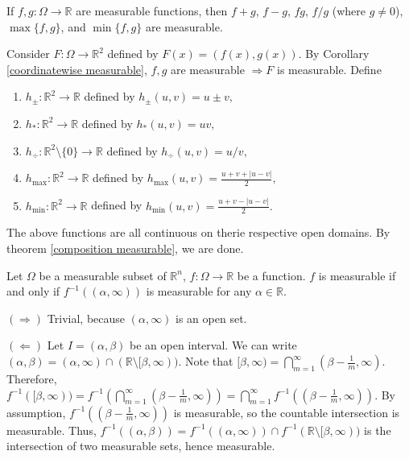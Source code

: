 \begin{corollary}
    If $f, g: \Omega \rightarrow \mathbb{R}$ are measurable functions, then $f+g$, $f-g$, $fg$, $f/g$ (where $g \neq 0$), $\max\{f,g\}$, and $\min\{f,g\}$ are measurable.
\end{corollary}

\begin{pfbox}
    Consider $F: \Omega \rightarrow \mathbb{R}^2$ defined by $F(x) = (f(x), g(x))$. By Corollary \eqref{coordinatewise measurable}, $f, g$ are measurable $\Rightarrow F$ is measurable. 
    Define 
    \begin{enumerate}
        \item $h_{\pm}: \mathbb{R}^2\to\mathbb{R}$ defined by $h_{\pm}(u,v) = u \pm v,$
        \item $h_{*}: \mathbb{R}^2\to\mathbb{R}$ defined by $h_{*}(u,v)=uv,$
        \item $h_{\div}: \mathbb{R}^2\setminus\{0\}\to\mathbb{R}$ defined by $h_{\div}(u,v) = u/v,$
        \item $h_{\max}: \mathbb{R}^2\to\mathbb{R}$ defined by $h_{\max}(u,v) = \frac{u+v+|u-v|}{2},$
        \item $h_{\min}: \mathbb{R}^2\to\mathbb{R}$ defined by $h_{\min}(u,v) = \frac{u+v-|u-v|}{2}.$
    \end{enumerate}
    The above functions are all continuous on therie respective open domains. By theorem \eqref{composition measurable}, we are done.
\end{pfbox}

\begin{proposition}
    Let $\Omega$ be a measurable subset of $\mathbb{R}^n$, $f:\Omega \rightarrow \mathbb{R}$ be a function. $f$ is measurable if and only if $f^{-1}((\alpha, \infty))$ is measurable for any $\alpha \in \mathbb{R}$.
\end{proposition}

\begin{pfbox}
    $(\Rightarrow)$ Trivial, because $(\alpha, \infty)$ is an open set.
    
    $(\Leftarrow)$ Let $I = (\alpha, \beta)$ be an open interval. We can write $(\alpha, \beta) = (\alpha, \infty) \cap (\mathbb{R} \setminus [\beta, \infty))$. Note that $[\beta, \infty) = \bigcap_{m=1}^\infty (\beta - \frac{1}{m}, \infty)$. 
    Therefore, $f^{-1}([\beta, \infty)) = f^{-1}\left(\bigcap_{m=1}^\infty (\beta - \frac{1}{m}, \infty)\right) = \bigcap_{m=1}^\infty f^{-1}((\beta - \frac{1}{m}, \infty))$. By assumption, $f^{-1}((\beta - \frac{1}{m}, \infty))$ is measurable, so the countable intersection is measurable. 
    Thus, $f^{-1}((\alpha, \beta)) = f^{-1}((\alpha, \infty)) \cap f^{-1}(\mathbb{R} \setminus [\beta, \infty))$ is the intersection of two measurable sets, hence measurable.
\end{pfbox}


